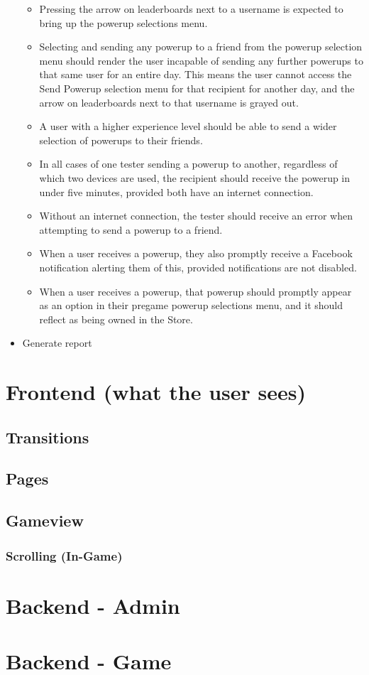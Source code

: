 \begin{itemize}
\begin{itemize}
\item Pressing the arrow on leaderboards next to a username is expected to bring up the powerup selections menu.
\item Selecting and sending any powerup to a friend from the powerup selection menu should render the user incapable of sending
any further powerups to that same user for an entire day. This means the user cannot access the Send Powerup selection menu for 
that recipient for another day, and the arrow on leaderboards next to that username is grayed out.
\item A user with a higher experience level should be able to send a wider selection of powerups to their friends.
\item In all cases of one tester sending a powerup to another, regardless of which two devices are used, the recipient should
receive the powerup in under five minutes, provided both have an internet connection.
\item Without an internet connection, the tester should receive an error when attempting to send a powerup to a friend.
\item When a user receives a powerup, they also promptly receive a Facebook notification alerting them of this, provided notifications are not disabled.
\item When a user receives a powerup, that powerup should promptly appear as an option in their pregame powerup selections menu, and it should
reflect as being owned in the Store.
\end{itemize}
\item Generate report 
\end{itemize}


\section{Frontend (what the user sees)}
\subsection{Transitions}
\subsection{Pages}
\subsection{Gameview}
\subsubsection{Scrolling (In-Game)}
\section{Backend - Admin}
\section{Backend - Game}
